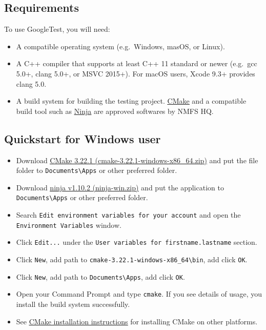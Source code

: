 \documentclass[
]{book}
\begin{document}
\hypertarget{requirements}{%
\subsection{Requirements}\label{requirements}}

To use GoogleTest, you will need:

\begin{itemize}
\item
  A compatible operating system (e.g.~Windows, masOS, or Linux).
\item
  A C++ compiler that supports at least C++ 11 standard or newer (e.g.~gcc 5.0+, clang 5.0+, or MSVC 2015+). For macOS users, Xcode 9.3+ provides clang 5.0.
\item
  A build system for building the testing project. \href{https://cmake.org/}{\underline{CMake}} and a compatible build tool such as \href{https://ninja-build.org/}{\underline{Ninja}} are approved softwares by NMFS HQ.
\end{itemize}

\hypertarget{quickstart-for-windows-user}{%
\subsection{Quickstart for Windows user}\label{quickstart-for-windows-user}}

\begin{itemize}
\item
  Download \href{https://github.com/Kitware/CMake/releases}{\underline{CMake 3.22.1 (cmake-3.22.1-windows-x86\_64.zip)}} and put the file folder to \texttt{Documents\textbackslash{}Apps} or other preferred folder.
\item
  Download \href{https://github.com/ninja-build/ninja/releases}{\underline{ninja v1.10.2 (ninja-win.zip)}} and put the application to \texttt{Documents\textbackslash{}Apps} or other preferred folder.
\item
  Search \texttt{Edit\ environment\ variables\ for\ your\ account} and open the \texttt{Environment\ Variables} window.
\item
  Click \texttt{Edit...} under the \texttt{User\ variables\ for\ firstname.lastname} section.
\item
  Click \texttt{New}, add path to \texttt{cmake-3.22.1-windows-x86\_64\textbackslash{}bin}, add click \texttt{OK}.
\item
  Click \texttt{New}, add path to \texttt{Documents\textbackslash{}Apps}, add click \texttt{OK}.
\item
  Open your Command Prompt and type \texttt{cmake}. If you see details of usage, you install the build system successfully.
\item
  See \href{https://cmake.org/install}{\underline{CMake installation instructions}} for installing CMake on other platforms.
\end{itemize}
\end{document}
